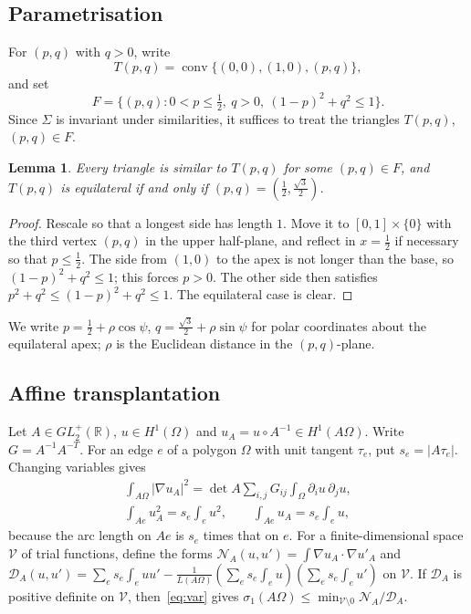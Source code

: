 \documentclass[11pt]{article}
\newtheorem{lemma}[theorem]{Lemma}
\theoremstyle{definition}
\theoremstyle{remark}
\newcommand{\R}{\mathbb{R}}
\begin{document}
\subsection{Parametrisation}
For $(p,q)$ with $q>0$, write
\[T(p,q)=\operatorname{conv}\{(0,0),(1,0),(p,q)\},\]
and set
\[F=\{(p,q):0<p\le\tfrac12,\ q>0,\ (1-p)^2+q^2\le1\}.\]
Since $\Sigma$ is invariant under similarities, it suffices to treat the triangles $T(p,q)$, $(p,q)\in F$.

\begin{lemma}\label{lem:param}
Every triangle is similar to $T(p,q)$ for some $(p,q)\in F$, and $T(p,q)$ is equilateral if and only if
$(p,q)=(\frac12,\frac{\sqrt3}{2})$.
\end{lemma}
\begin{proof}
Rescale so that a longest side has length $1$. Move it to $[0,1]\times\{0\}$ with the third vertex
$(p,q)$ in the upper half-plane, and reflect in $x=\frac12$ if necessary so that $p\le\frac12$. The side
from $(1,0)$ to the apex is not longer than the base, so $(1-p)^2+q^2\le1$; this forces $p>0$. The other
side then satisfies $p^2+q^2\le(1-p)^2+q^2\le1$. The equilateral case is clear.
\end{proof}

We write $p=\frac12+\rho\cos\psi$, $q=\frac{\sqrt3}2+\rho\sin\psi$ for polar coordinates about the
equilateral apex; $\rho$ is the Euclidean distance in the $(p,q)$-plane.

\subsection{Affine transplantation}
Let $A\in GL_2^+(\R)$, $u\in H^1(\Omega)$ and $u_A=u\circ A^{-1}\in H^1(A\Omega)$. Write $G=A^{-1}A^{-T}$. For
an edge $e$ of a polygon $\Omega$ with unit tangent $\tau_e$, put $s_e=|A\tau_e|$. Changing variables gives
\begin{equation}\label{eq:transplant}
\begin{gathered}
\int_{A\Omega}|\nabla u_A|^2=\det A\sum_{i,j}G_{ij}\int_\Omega\partial_iu\,\partial_ju,\\
\int_{Ae}u_A^2=s_e\int_eu^2,\qquad \int_{Ae}u_A=s_e\int_eu,
\end{gathered}
\end{equation}
because the arc length on $Ae$ is $s_e$ times that on $e$. For a finite-dimensional space $\mathcal V$ of trial
functions, define the forms
$\mathcal N_A(u,u')=\int\nabla u_A\cdot\nabla u'_A$ and
$\mathcal D_A(u,u')=\sum_es_e\int_euu'-\frac1{L(A\Omega)}(\sum_es_e\int_eu)(\sum_es_e\int_eu')$ on $\mathcal V$.
If $\mathcal D_A$ is positive definite on $\mathcal V$, then~\eqref{eq:var} gives
$\sigma_1(A\Omega)\le\min_{\mathcal V\setminus 0}\mathcal N_A/\mathcal D_A$.
\end{document}
